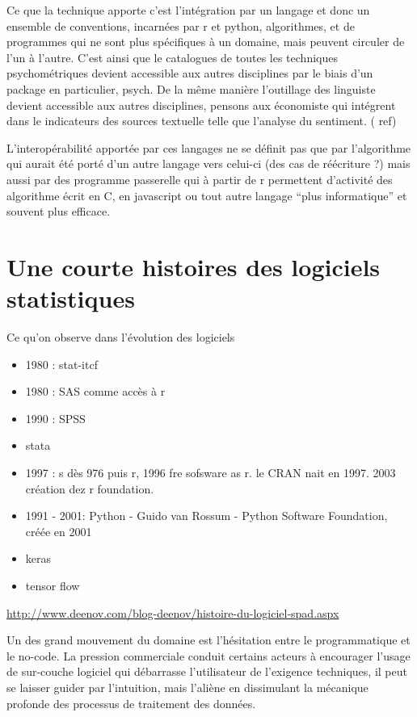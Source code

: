 \documentclass[
]{book}
\providecommand{\tightlist}{%
  \setlength{\itemsep}{0pt}\setlength{\parskip}{0pt}}
\begin{document}
Ce que la technique apporte c'est l'intégration par un langage et donc un ensemble de conventions, incarnées par r et python, algorithmes, et de programmes qui ne sont plus spécifiques à un domaine, mais peuvent circuler de l'un à l'autre. C'est ainsi que le catalogues de toutes les techniques psychométriques devient accessible aux autres disciplines par le biais d'un package en particulier, psych. De la même manière l'outillage des linguiste devient accessible aux autres disciplines, pensons aux économiste qui intégrent dans le indicateurs des sources textuelle telle que l'analyse du sentiment. ( ref)

L'interopérabilité apportée par ces langages ne se définit pas que par l'algorithme qui aurait été porté d'un autre langage vers celui-ci (des cas de réécriture ?) mais aussi par des programme passerelle qui à partir de r permettent d'activité des algorithme écrit en C, en javascript ou tout autre langage ``plus informatique'' et souvent plus efficace.

\hypertarget{une-courte-histoires-des-logiciels-statistiques}{%
\section{Une courte histoires des logiciels statistiques}\label{une-courte-histoires-des-logiciels-statistiques}}

Ce qu'on observe dans l'évolution des logiciels

\begin{itemize}
\tightlist
\item
  1980 : stat-itcf
\item
  1980 : SAS comme accès à r
\item
  1990 : SPSS
\item
  stata
\item
  1997 : s dès 976 puis r, 1996 fre sofsware as r. le CRAN nait en 1997. 2003 création dez r foundation.
\item
  1991 - 2001: Python - Guido van Rossum - Python Software Foundation, créée en 2001
\item
  keras
\item
  tensor flow
\end{itemize}

\url{http://www.deenov.com/blog-deenov/histoire-du-logiciel-spad.aspx}

Un des grand mouvement du domaine est l'hésitation entre le programmatique et le no-code. La pression commerciale conduit certains acteurs à encourager l'usage de sur-couche logiciel qui débarrasse l'utilisateur de l'exigence techniques, il peut se laisser guider par l'intuition, mais l'aliène en dissimulant la mécanique profonde des processus de traitement des données.
\end{document}
